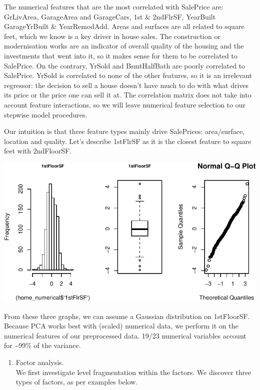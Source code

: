 \documentclass[]{article}
\providecommand{\tightlist}{%
  \setlength{\itemsep}{0pt}\setlength{\parskip}{0pt}}
\begin{document}
The numerical features that are the most correlated with SalePrice are:
GrLivArea, GarageArea and GarageCars, 1st \& 2ndFlrSF, YearBuilt
GarageYrBuilt \& YearRemodAdd. Areas and surfaces are all related to
square feet, which we know is a key driver in house sales. The
construction or modernisation works are an indicator of overall quality
of the housing and the investments that went into it, so it makes sense
for them to be correlated to SalePrice. On the contrary, YrSold and
BsmtHalfBath are poorly correlated to SalePrice. YrSold is correlated to
none of the other features, so it is an irrelevant regressor: the
decision to sell a house doesn't have much to do with what drives its
price or the price one can sell it at. The correlation matrix does not
take into account feature interactions, so we will leave numerical
feature selection to our stepwise model procedures.

Our intuition is that three feature types mainly drive SalePrices:
area/surface, location and quality. Let's describe 1stFlrSF as it is the
closest feature to square feet with 2ndFloorSF.

\begin{center}\includegraphics{r_file_v5_files/figure-latex/unnamed-chunk-11-1} \end{center}

From these three graphs, we can assume a Gaussian distribution on
1stFloorSF.\\
Because PCA works best with (scaled) numerical data, we perform it on
the numerical features of our preprocessed data. 19/23 numerical
variables account for \textasciitilde{}99\% of the variance.

\begin{enumerate}
\def\labelenumi{\arabic{enumi}.}
\setcounter{enumi}{2}
\tightlist
\item
  Factor analysis.\\
  We first investigate level fragmentation within the factors. We
  discover three types of factors, as per examples below.
\end{enumerate}
\end{document}
